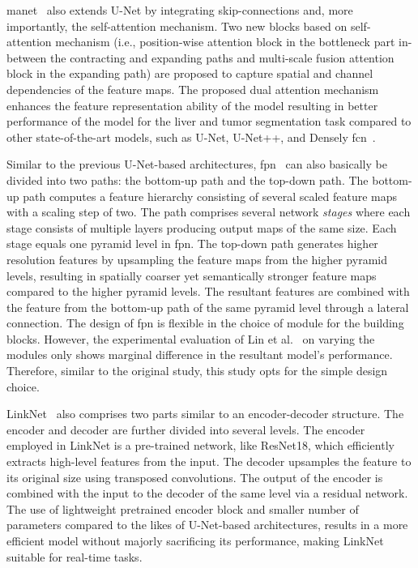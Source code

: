 \documentclass[mathematics,article,submit,pdftex,moreauthors]{Definitions/mdpi}
\begin{document}
\ac{manet}~\cite{Fan2020} also extends U-Net by integrating
skip-connections and, more importantly, the self-attention mechanism.
Two new blocks based on self-attention mechanism (i.e., 
position-wise attention block in the bottleneck
part in-between the contracting and expanding paths
and multi-scale fusion attention block in the expanding
path) are proposed to capture spatial and channel
dependencies of the feature maps. The proposed dual
attention mechanism enhances the feature representation ability
of the model resulting in better performance
of the model for the liver and tumor segmentation
task compared to other state-of-the-art models,
such as U-Net, U-Net++, and Densely \ac{fcn}~\cite{Krishna2018}.

Similar to the previous U-Net-based architectures,
\ac{fpn}~\cite{Lin2017} can also basically 
be divided into two paths: the bottom-up path
and the top-down path. The bottom-up
path computes a feature hierarchy consisting
of several scaled feature maps with a scaling
step of two. The path comprises several network
\textit{stages} where each stage consists of multiple layers
producing output maps of the same size.
Each stage equals one pyramid level in \ac{fpn}.
The top-down path generates higher resolution
features by upsampling the feature maps from
the higher pyramid levels, resulting
in spatially coarser yet semantically stronger feature maps
compared to the higher pyramid levels.
The resultant features are combined with
the feature from the bottom-up
path of the same pyramid level through a lateral
connection. The design of \ac{fpn}
is flexible in the choice of module
for the building blocks.
However, the experimental evaluation of
Lin et al.~\cite{Lin2017} on varying the modules only
shows marginal difference in the resultant model's
performance. Therefore, similar to the original study,
this study opts for the simple design choice.

LinkNet~\cite{Chaurasia2017} also comprises two parts similar
to an encoder-decoder structure. 
The encoder and decoder are further
divided into several levels.
The encoder employed in LinkNet is a pre-trained
network, like ResNet18, which
efficiently extracts high-level features from
the input. The decoder upsamples the feature
to its original size using transposed
convolutions. The output of the
encoder is combined with the input
to the decoder of the same level via
a residual network. The use of lightweight
pretrained encoder block and smaller
number of parameters compared to the likes of 
U-Net-based architectures, results 
in a more efficient model without
majorly sacrificing its performance,
making LinkNet suitable for real-time
tasks.
\end{document}
